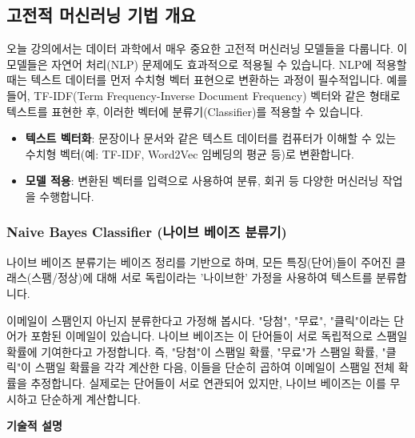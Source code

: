 \documentclass[11pt,a4paper]{article}
\theoremstyle{definition}
\begin{document}
\newpage
\subsection{고전적 머신러닝 기법 개요}

오늘 강의에서는 데이터 과학에서 매우 중요한 고전적 머신러닝 모델들을 다룹니다. 이 모델들은 자연어 처리(NLP) 문제에도 효과적으로 적용될 수 있습니다. NLP에 적용할 때는 텍스트 데이터를 먼저 수치형 벡터 표현으로 변환하는 과정이 필수적입니다. 예를 들어, TF-IDF(Term Frequency-Inverse Document Frequency) 벡터와 같은 형태로 텍스트를 표현한 후, 이러한 벡터에 분류기(Classifier)를 적용할 수 있습니다.

\begin{infobox}[title={NLP에 고전적 모델 적용하기}]
\begin{itemize}
    \item \textbf{텍스트 벡터화}: 문장이나 문서와 같은 텍스트 데이터를 컴퓨터가 이해할 수 있는 수치형 벡터(예: TF-IDF, Word2Vec 임베딩의 평균 등)로 변환합니다.
    \item \textbf{모델 적용}: 변환된 벡터를 입력으로 사용하여 분류, 회귀 등 다양한 머신러닝 작업을 수행합니다.
\end{itemize}
\end{infobox}

\subsubsection{Naive Bayes Classifier (나이브 베이즈 분류기)}

\begin{summarybox}[title={한 줄 핵심 요약}]
나이브 베이즈 분류기는 베이즈 정리를 기반으로 하며, 모든 특징(단어)들이 주어진 클래스(스팸/정상)에 대해 서로 독립이라는 '나이브한' 가정을 사용하여 텍스트를 분류합니다.
\end{summarybox}

\begin{examplebox}[title={직관적 예시/비유}]
이메일이 스팸인지 아닌지 분류한다고 가정해 봅시다. "당첨", "무료", "클릭"이라는 단어가 포함된 이메일이 있습니다. 나이브 베이즈는 이 단어들이 서로 독립적으로 스팸일 확률에 기여한다고 가정합니다. 즉, "당첨"이 스팸일 확률, "무료"가 스팸일 확률, "클릭"이 스팸일 확률을 각각 계산한 다음, 이들을 단순히 곱하여 이메일이 스팸일 전체 확률을 추정합니다. 실제로는 단어들이 서로 연관되어 있지만, 나이브 베이즈는 이를 무시하고 단순하게 계산합니다.
\end{examplebox}

\textbf{기술적 설명}
\end{document}
